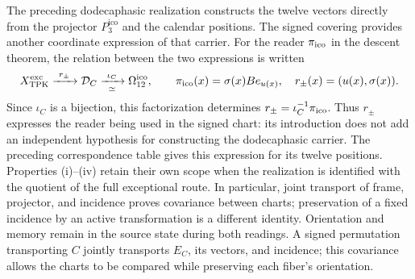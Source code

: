 The preceding dodecaphasic realization constructs the twelve vectors
directly from the projector \(P_3^{\mathrm{ico}}\) and the calendar positions.
The signed covering provides another coordinate expression of that
carrier. For the reader \(\pi_{\rm ico}\) in the descent theorem,
the relation between the two expressions is written
\begin{equation}
 X_{\rm TPK}^{\rm exc}\xrightarrow{\ r_\pm\ }
 \mathcal D_C\xrightarrow[\simeq]{\ \iota_C\ }
 \Omega_{12}^{\rm ico},\qquad
 \pi_{\rm ico}(x)=\sigma(x)Be_{u(x)},\quad
 r_\pm(x)=(u(x),\sigma(x)).
 \label{ii:ico:factorizacion-lector}
\end{equation}
Since \(\iota_C\) is a bijection, this factorization determines
\(r_\pm=\iota_C^{-1}\pi_{\rm ico}\). Thus \(r_\pm\) expresses
the reader being used in the signed chart: its introduction
does not add an independent hypothesis for constructing the dodecaphasic
carrier. The preceding correspondence table gives this expression
for its twelve positions. Properties (i)--(iv) retain their
own scope when the realization is identified with the quotient
of the full exceptional route. In particular, joint transport
of frame, projector, and incidence proves covariance between charts;
preservation of a fixed incidence by an active transformation
is a different identity. Orientation and memory remain
in the source state during both readings.
A signed permutation transporting \(C\) jointly transports
\(E_C\), its vectors, and incidence; this covariance allows the
charts to be compared while preserving each fiber's orientation.
